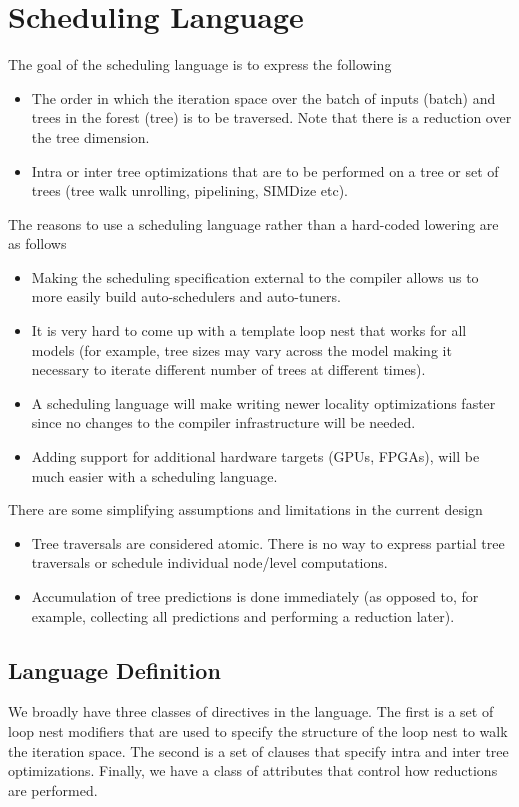 \section{Scheduling Language}
The goal of the scheduling language is to express the following
\begin{itemize}
  \item The order in which the iteration space over the batch of inputs (batch) and trees in the forest (tree) is to be traversed. Note that there is a reduction over the tree dimension.
  \item Intra or inter tree optimizations that are to be performed on a tree or set of trees (tree walk unrolling, pipelining, SIMDize etc).
\end{itemize}

The reasons to use a scheduling language rather than a hard-coded lowering are as follows
\begin{itemize}
  \item Making the scheduling specification external to the compiler allows us to 
  more easily build auto-schedulers and auto-tuners.
  \item It is very hard to come up with a template loop nest that works for all models 
  (for example, tree sizes may vary across the model making it necessary to iterate 
  different number of trees at different times).
  \item A scheduling language will make writing newer locality optimizations faster since 
  no changes to the compiler infrastructure will be needed.
  \item Adding support for additional hardware targets (GPUs, FPGAs), will be much easier
  with a scheduling language.
\end{itemize}

There are some simplifying assumptions and limitations in the current design
\begin{itemize}
  \item Tree traversals are considered atomic. There is no way to express partial
   tree traversals or schedule individual node/level computations. 
  \item Accumulation of tree predictions is done immediately (as opposed to, 
  for example, collecting all predictions and performing a reduction later).
\end{itemize}

\subsection{Language Definition}
We broadly have three classes of directives in the language. The first is a set 
of loop nest modifiers that are used to specify the structure of the loop nest to
walk the iteration space. The second is a set of clauses that specify intra and 
inter tree optimizations. Finally, we have a class of attributes that control how 
reductions are performed.

